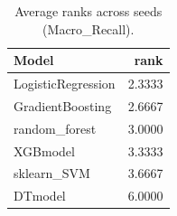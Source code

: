 \begin{table}[t]
\centering
\begin{tabular}{lr}
\toprule
Model & rank \\
\midrule
LogisticRegression & 2.3333 \\
GradientBoosting & 2.6667 \\
random_forest & 3.0000 \\
XGBmodel & 3.3333 \\
sklearn_SVM & 3.6667 \\
DTmodel & 6.0000 \\
\bottomrule
\end{tabular}
\caption{Average ranks across seeds (Macro_Recall).}
\label{tab:avg_rank_Macro_Recall}
\end{table}